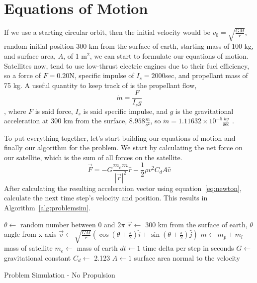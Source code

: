 \documentclass{article}
\begin{document}
\section{Equations of Motion}

If we use a starting circular orbit, then the initial velocity would be $v_0=\sqrt{\frac{GM}{r}}$, random initial position 300 km from the surface of earth, starting mass of 100 kg, and surface area, $A$, of 1 $\text{m}^2$, we can start to formulate our equations of motion. Satellites now, tend to use low-thrust electric engines due to their fuel efficiency, so a force of $F=0.20$N, specific impulse of $I_s=2000$sec, and propellant mass of 75 kg. A useful quantity to keep track of is the propellant flow, 
\begin{equation}
\dot{m}=\frac{F}{I_sg}
\end{equation}
, where $F$ is said force, $I_s$ is said specific impulse, and $g$ is the gravitational acceleration at 300 km from the surface, $8.958\frac{m}{s^2}$, so $\dot{m}=1.11632\times 10^{-5}\frac{kg}{\text{sec}}$ \cite{sutton_biblarz_2017}.

To put everything together, let's start building our equations of motion and finally our algorithm for the problem. We start by calculating the net force on our satellite, which is the sum of all forces on the satellite. 
\begin{equation}
\vec{F}=-G\frac{m_e m}{|\vec{r}|^2}\hat{r}-\frac{1}{2}\rho v^2 C_d A\hat{v}
\end{equation}
After calculating the resulting acceleration vector using equation~\ref{eq:newton}, calculate the next time step's velocity and position. This results in Algorithm~\ref{alg:problemsim}.

\begin{algorithm}
	\SetAlgoLined
	\DontPrintSemicolon
	$\theta\leftarrow$ random number between $0$ and $2\pi$\;
	$\vec{r}\leftarrow$ 300 km from the surface of earth, $\theta$ angle from x-axis\;
	$\vec{v}\leftarrow \sqrt{\frac{GM}{r}}(\cos(\theta+\frac{\pi}{2})\hat{i}+\sin(\theta+\frac{\pi}{2})\hat{j})$ \;
	$m\leftarrow m_p+m_l$ mass of satellite\;
	$m_e\leftarrow$ mass of earth \;
	$dt\leftarrow 1$ time delta per step in seconds \;
	$G\leftarrow$ gravitational constant \;
	$C_d\leftarrow$ 2.123 \;
	$A\leftarrow1$ surface area normal to the velocity\;
	\caption{Problem Simulation - No Propulsion}\label{alg:problemsim}
\end{algorithm}
\end{document}
